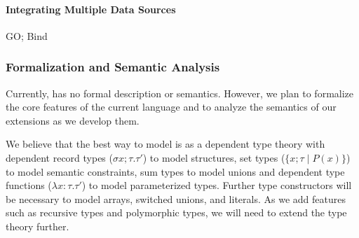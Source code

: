 \documentclass[11pt]{article}
\begin{document}
% 

\paragraph*{Integrating Multiple Data Sources}

GO; Bind


\subsubsection{Formalization and Semantic Analysis}

Currently, \pads{} has no formal description or semantics. However,
we plan to formalize the core features of the current language
and to analyze the semantics of our extensions as we develop them.

We believe that the best way to model \pads{} is as a dependent
type theory with dependent record types ($\sigma x;\tau.\tau'$) to model
\pads{} structures, set types ($\{x;\tau \; | \; P(x) \}$) to model
semantic constraints, sum types to model unions and dependent type functions
($\lambda x{:}\tau.\tau'$) to model parameterized \pads types.  Further
type constructors will be necessary to model arrays, switched unions,
and literals.  As we add features such as recursive types and polymorphic types,
we will need to extend the type theory further.
\end{document}
